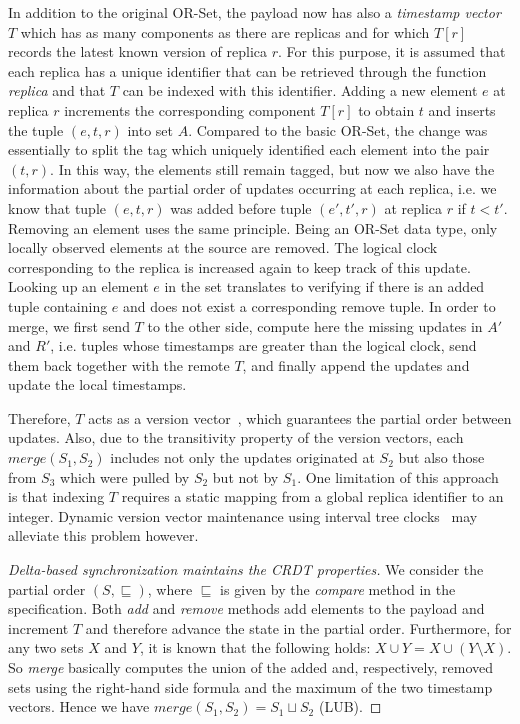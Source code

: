 In addition to the original OR-Set, the payload now has also a \textit{timestamp
vector} $T$ which has as many components as there are replicas and for which
$T[r]$ records the latest known version of replica $r$. For this purpose, it is
assumed that each replica has a unique identifier that can be retrieved through
the function \textit{replica} and that $T$ can be indexed with this identifier.
Adding a new element $e$ at replica $r$ increments the corresponding component
$T[r]$ to obtain $t$ and inserts the tuple $(e, t, r)$ into set $A$. Compared to
the basic OR-Set, the change was essentially to split the tag which uniquely
identified each element into the pair $(t, r)$. In this way, the elements still
remain tagged, but now we also have the information about the partial order of
updates occurring at each replica, i.e. we know that tuple $(e, t, r)$ was added
before tuple $(e', t', r)$ at replica $r$ if $t < t'$. Removing an element uses
the same principle. Being an OR-Set data type, only locally observed elements at
the source are removed. The logical clock corresponding to the replica is
increased again to keep track of this update. Looking up an element $e$ in the
set translates to verifying if there is an added tuple containing $e$ and does
not exist a corresponding remove tuple. In order to merge, we first send $T$ to
the other side, compute here the missing updates in $A'$ and $R'$, i.e. tuples
whose timestamps are greater than the logical clock, send them back together
with the remote $T$, and finally append the updates and update the local
timestamps. 

Therefore, $T$ acts as a version vector~\cite{Parker:1983:DMI:1313337.1313753},
which guarantees the partial order between updates. Also, due to the
transitivity property of the version vectors, each $\textit{merge}(S_{1},
S_{2})$ includes not only the updates originated at $S_{2}$ but also those from
$S_{3}$ which were pulled by $S_{2}$ but not by $S_{1}$. One limitation of this
approach is that indexing $T$ requires a static mapping from a global replica
identifier to an integer. Dynamic version vector maintenance using interval tree
clocks~\cite{Almeida:2008:ITC:1496310.1496330} may alleviate this problem
however.

\begin{proof}[Delta-based synchronization maintains the CRDT
properties] 
We consider the partial order $(S, \sqsubseteq)$, where $\sqsubseteq$ is given
by the \textit{compare} method in the specification. Both \textit{add} and
\textit{remove} methods add elements to the payload and increment $T$ and
therefore advance the state in the partial order. Furthermore, for any two sets
$X$ and $Y$, it is known that the following holds: $X \cup Y = X \cup (Y
\setminus X)$. So \textit{merge} basically computes the union of the added and,
respectively, removed sets using the right-hand side formula and the maximum of
the two timestamp vectors. Hence we have $\textit{merge}(S_{1}, S_{2}) = S_{1}
\sqcup S_{2}$ (LUB).
\end{proof}